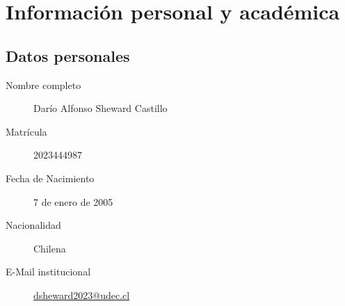 \documentclass[../portafolio.tex]{subfiles}
\begin{document}
\chapter*{Información personal y académica}


\section*{Datos personales}

\begin{description}
\item[{Nombre completo}] Darío Alfonso Sheward Castillo %
\item[{Matrícula}] 2023444987               %
\item[{Fecha de Nacimiento}] 7 de enero de 2005 %
\item[{Nacionalidad}] Chilena
\item[{E-Mail institucional}] \href{mailto:dsheward2023@udec.cl}{dsheward2023@udec.cl}
\end{description}


\end{document}
